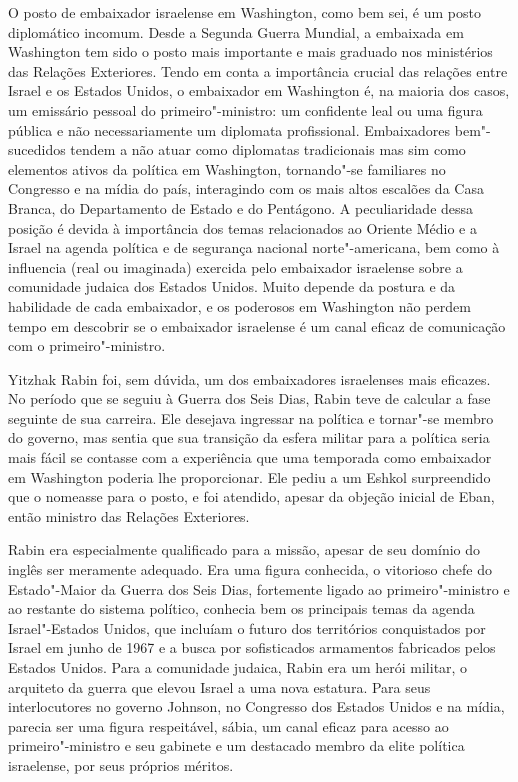 O posto de embaixador israelense em Washington, como bem sei, é um posto
diplomático incomum. Desde a Segunda Guerra Mundial, a embaixada em
Washington tem sido o posto mais importante e mais graduado nos
ministérios das Relações Exteriores. Tendo em conta a importância crucial
das relações entre Israel e os Estados Unidos, o embaixador em
Washington é, na maioria dos casos, um emissário pessoal do primeiro"-ministro:
um confidente leal ou uma figura pública e não
necessariamente um diplomata profissional. Embaixadores bem"-sucedidos
tendem a não atuar como diplomatas tradicionais mas sim como elementos
ativos da política em Washington, tornando"-se familiares no Congresso e
na mídia do país, interagindo com os mais altos escalões da Casa
Branca, do Departamento de Estado e do Pentágono. A peculiaridade dessa
posição é devida à importância dos temas relacionados ao Oriente Médio e a
Israel na agenda política e de segurança nacional norte"-americana, bem como à
influencia (real ou imaginada) exercida pelo embaixador israelense sobre
a comunidade judaica dos Estados Unidos. Muito depende da postura e da
habilidade de cada embaixador, e os poderosos em Washington não perdem
tempo em descobrir se o embaixador israelense é um canal eficaz de
comunicação com o primeiro"-ministro.

Yitzhak Rabin foi, sem dúvida, um dos embaixadores israelenses mais
eficazes. No período que se seguiu à Guerra dos Seis Dias, Rabin teve
de calcular a fase seguinte de sua carreira. Ele desejava ingressar na
política e tornar"-se membro do governo, mas sentia que sua transição da
esfera militar para a política seria mais fácil se contasse com a
experiência que uma temporada como embaixador em Washington poderia lhe
proporcionar. Ele pediu a um Eshkol surpreendido que o nomeasse para
o posto, e foi atendido, apesar da objeção inicial de Eban, então
ministro das Relações Exteriores.

Rabin era especialmente qualificado para a missão, apesar de seu domínio
do inglês ser meramente adequado. Era uma figura conhecida, o vitorioso
chefe do Estado"-Maior da Guerra dos Seis Dias, fortemente ligado ao
primeiro"-ministro e ao restante do sistema político, conhecia bem os
principais temas da agenda Israel"-Estados Unidos, que incluíam o futuro
dos territórios conquistados por Israel em junho de 1967 e a busca por
sofisticados armamentos fabricados pelos Estados Unidos. Para
a comunidade judaica, Rabin era um herói militar, o arquiteto da guerra
que elevou Israel a uma nova estatura. Para seus interlocutores no
governo Johnson, no Congresso dos Estados Unidos e na mídia, parecia ser uma figura
respeitável, sábia, um canal eficaz para acesso ao primeiro"-ministro e
seu gabinete e um destacado membro da elite política israelense, por
seus próprios méritos.

